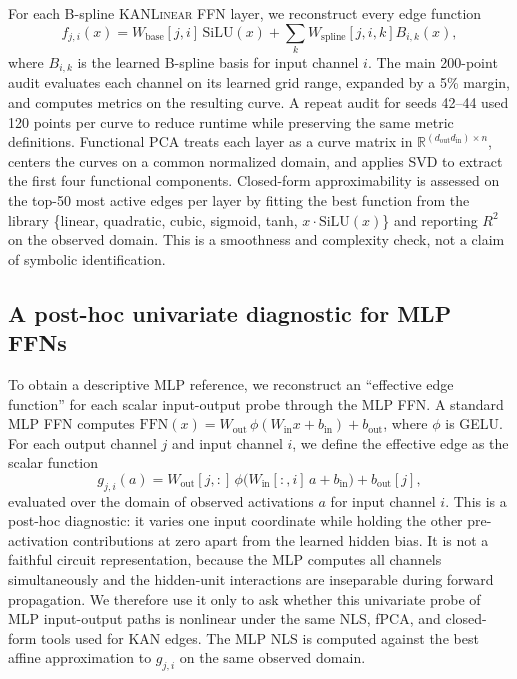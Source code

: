 \documentclass[11pt]{article}
\newcommand{\modelname}[1]{\textsc{#1}}
\newcommand{\kanlinear}{\modelname{KANLinear}}
\begin{document}
For each B-spline \kanlinear{} FFN layer, we reconstruct every edge function
\[
f_{j,i}(x)=W_{\mathrm{base}}[j,i]\,\mathrm{SiLU}(x)+\sum_k W_{\mathrm{spline}}[j,i,k]B_{i,k}(x),
\]
where \(B_{i,k}\) is the learned B-spline basis for input channel \(i\). The main 200-point audit evaluates each channel on its learned grid range, expanded by a 5\% margin, and computes metrics on the resulting curve. A repeat audit for seeds 42--44 used 120 points per curve to reduce runtime while preserving the same metric definitions. Functional PCA treats each layer as a curve matrix in \(\mathbb{R}^{(d_{\mathrm{out}}d_{\mathrm{in}})\times n}\), centers the curves on a common normalized domain, and applies SVD to extract the first four functional components. Closed-form approximability is assessed on the top-50 most active edges per layer by fitting the best function from the library \{linear, quadratic, cubic, sigmoid, tanh, \(x\cdot\mathrm{SiLU}(x)\)\} and reporting \(R^2\) on the observed domain. This is a smoothness and complexity check, not a claim of symbolic identification.

\subsection{A post-hoc univariate diagnostic for MLP FFNs}
\label{sec:mlp-edge}

To obtain a descriptive MLP reference, we reconstruct an ``effective edge function'' for each scalar input-output probe through the MLP FFN. A standard MLP FFN computes \(\mathrm{FFN}(x)=W_{\mathrm{out}}\,\phi(W_{\mathrm{in}}x+b_{\mathrm{in}})+b_{\mathrm{out}}\), where \(\phi\) is GELU. For each output channel \(j\) and input channel \(i\), we define the effective edge as the scalar function
\[
g_{j,i}(a)=W_{\mathrm{out}}[j,:]\,\phi\bigl(W_{\mathrm{in}}[:,i]\,a+b_{\mathrm{in}}\bigr)+b_{\mathrm{out}}[j],
\]
evaluated over the domain of observed activations \(a\) for input channel \(i\). This is a post-hoc diagnostic: it varies one input coordinate while holding the other pre-activation contributions at zero apart from the learned hidden bias. It is not a faithful circuit representation, because the MLP computes all channels simultaneously and the hidden-unit interactions are inseparable during forward propagation. We therefore use it only to ask whether this univariate probe of MLP input-output paths is nonlinear under the same NLS, fPCA, and closed-form tools used for KAN edges. The MLP NLS is computed against the best affine approximation to \(g_{j,i}\) on the same observed domain.
\end{document}

